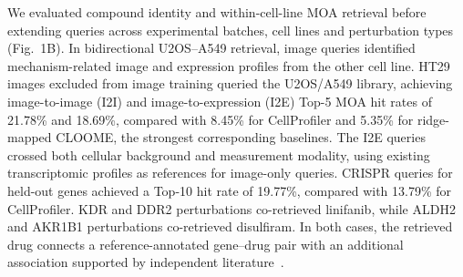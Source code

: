 We evaluated compound identity and within-cell-line MOA retrieval before extending queries across experimental batches, cell lines and perturbation types (Fig.~1B). In bidirectional U2OS--A549 retrieval, image queries identified mechanism-related image and expression profiles from the other cell line. HT29 images excluded from image training queried the U2OS/A549 library, achieving image-to-image (I2I) and image-to-expression (I2E) Top-5 MOA hit rates of 21.78\% and 18.69\%, compared with 8.45\% for CellProfiler and 5.35\% for ridge-mapped CLOOME, the strongest corresponding baselines. The I2E queries crossed both cellular background and measurement modality, using existing transcriptomic profiles as references for image-only queries. CRISPR queries for held-out genes achieved a Top-10 hit rate of 19.77\%, compared with 13.79\% for CellProfiler. KDR and DDR2 perturbations co-retrieved linifanib, while ALDH2 and AKR1B1 perturbations co-retrieved disulfiram. In both cases, the retrieved drug connects a reference-annotated gene--drug pair with an additional association supported by independent literature~\cite{karaman2008,yoshino2020npl4}.

